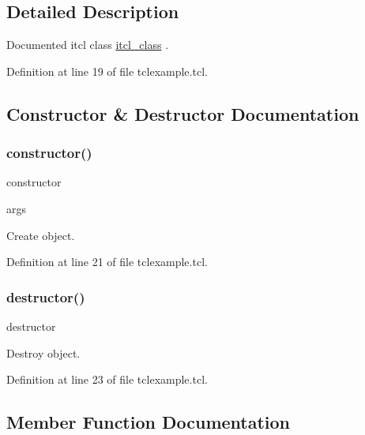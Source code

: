 \subsection{Detailed Description}
Documented itcl class {\ttfamily \hyperlink{classns_1_1itcl__class}{itcl\+\_\+class}} . 

Definition at line 19 of file tclexample.\+tcl.



\subsection{Constructor \& Destructor Documentation}
\mbox{\label{classns_1_1itcl__class_a774a51943bf6609f7582ee38c55a13f0}} 
\subsubsection{\texorpdfstring{constructor()}{constructor()}}
{\footnotesize\ttfamily constructor\begin{DoxyParamCaption}\item[{}]{args  }\end{DoxyParamCaption}}

Create object. 

Definition at line 21 of file tclexample.\+tcl.

\mbox{\label{classns_1_1itcl__class_aa04747d49a3a74e75fcfdaf017a73877}} 
\subsubsection{\texorpdfstring{destructor()}{destructor()}}
{\footnotesize\ttfamily destructor}

Destroy object. 

Definition at line 23 of file tclexample.\+tcl.



\subsection{Member Function Documentation}
\mbox{\label{classns_1_1itcl__class_ac6935d07ea2c4734cdc930c839ee8c8b}} 
